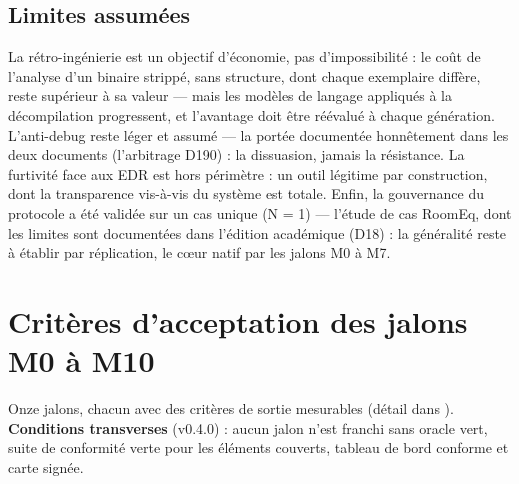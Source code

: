 \subsection{Limites assumées}\label{sec:limites}

La rétro-ingénierie est un objectif d'économie, pas d'impossibilité : le coût de l'analyse
d'un binaire strippé, sans structure, dont chaque exemplaire diffère, reste supérieur à sa
valeur — mais les modèles de langage appliqués à la décompilation progressent, et
l'avantage doit être réévalué à chaque génération. L'anti-debug reste léger et assumé — la portée documentée honnêtement dans
les deux documents (l'arbitrage D190) : la dissuasion, jamais la résistance.
La furtivité face aux EDR est hors périmètre : un outil légitime par construction, dont
la transparence vis-à-vis du système est totale. Enfin, la gouvernance du protocole a été
validée sur un cas unique (N = 1) — l'étude de cas RoomEq, dont les limites sont
documentées dans l'édition académique (D18) : la généralité reste à établir par
réplication, le cœur natif par les jalons M0 à M7.

\section{Critères d'acceptation des jalons M0 à M10}\label{sec:jalons}

Onze jalons, chacun avec des critères de sortie mesurables (détail dans
). \textbf{Conditions transverses} (v0.4.0) : aucun jalon n'est
franchi sans oracle vert, suite de conformité verte pour les éléments couverts, tableau de
bord conforme et carte signée.

